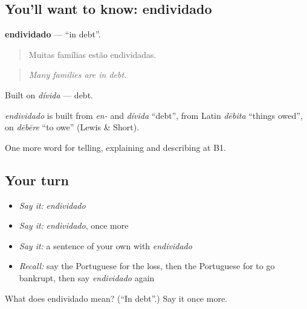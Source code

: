 \subsection*{You'll want to know: endividado}
\textbf{endividado} — \textquotedblleft{}in debt\textquotedblright{}.

\begin{quote}
Muitas famílias estão endividadas.
\end{quote}

\begin{quote}
\emph{Many families are in debt.}
\end{quote}

Built on \emph{dívida} — debt.

\begin{cousinweb}
\emph{endividado} is built from \emph{en-} and \emph{dívida} \textquotedblleft{}debt\textquotedblright{}, from Latin \emph{dēbita} \textquotedblleft{}things owed\textquotedblright{}, on \emph{dēbēre} \textquotedblleft{}to owe\textquotedblright{} (Lewis \& Short).
\end{cousinweb}

\begin{grammarlens}[title={What you've built}]
One more word for telling, explaining and describing at B1.
\end{grammarlens}

\subsection*{Your turn}
\begin{itemize}
\raggedright
  \item \emph{Say it:} \emph{endividado}
  \item \emph{Say it:} \emph{endividado}, once more
  \item \emph{Say it:} a sentence of your own with \emph{endividado}
  \item \emph{Recall:} say the Portuguese for the loss, then the Portuguese for to go bankrupt, then say \emph{endividado} again
\end{itemize}

\begin{tcolorbox}[breakable,colback=teal!4,colframe=teal!35!black,title={Before you move on}]
What does endividado mean? (\textquotedblleft{}In debt\textquotedblright{}.) Say it once more.
\end{tcolorbox}
